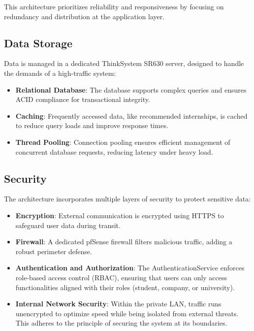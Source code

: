         This architecture prioritizes reliability and responsiveness by focusing on redundancy and distribution at the application layer.

    \subsection{Data Storage}

        Data is managed in a dedicated ThinkSystem SR630 server, designed to handle the demands of a high-traffic system:

        \begin{itemize}
            \item \textbf{Relational Database}: The database supports complex queries and ensures ACID compliance for transactional integrity.
            \item \textbf{Caching}: Frequently accessed data, like recommended internships, is cached to reduce query loads and improve response times.
            \item \textbf{Thread Pooling}: Connection pooling ensures efficient management of concurrent database requests, reducing latency under heavy load.
        \end{itemize}

    \subsection{Security}

        The architecture incorporates multiple layers of security to protect sensitive data:

        \begin{itemize}
            \item \textbf{Encryption}: External communication is encrypted using HTTPS to safeguard user data during transit.
            \item \textbf{Firewall}: A dedicated pfSense firewall filters malicious traffic, adding a robust perimeter defense.
            \item \textbf{Authentication and Authorization}: The AuthenticationService enforces role-based access control (RBAC), ensuring that users can only access functionalities aligned with their roles (student, company, or university).
            \item \textbf{Internal Network Security}: Within the private LAN, traffic runs unencrypted to optimize speed while being isolated from external threats. This adheres to the principle of securing the system at its boundaries.       
        \end{itemize}
